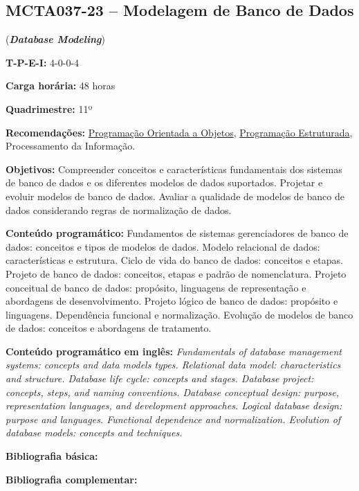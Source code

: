 \documentclass[12pt,a4paper]{article}
\begin{document}
\subsection{MCTA037-23 -- Modelagem de Banco de Dados}
\label{disc:mbd}

(\textbf{\textit{Database Modeling}})

\begin{center}
\begin{minipage}{0.85\textwidth}
    
    \textbf{T-P-E-I:} 4-0-0-4

    \textbf{Carga horária:} 48 horas
    
    \textbf{Quadrimestre:} 11º 
    
    \textbf{Recomendações:} 
    \hyperref[disc:poo]{Programação Orientada a Objetos},
    \hyperref[disc:pe]{Programação Estruturada},
    Processamento da Informação.
    
\end{minipage}
\end{center}

\textbf{Objetivos:}
Compreender conceitos e características fundamentais dos sistemas de banco de
dados e os diferentes modelos de dados suportados. 
Projetar e evoluir modelos de banco de dados. 
Avaliar a qualidade de modelos de banco de dados considerando regras de
normalização de dados.

\textbf{Conteúdo programático:}
Fundamentos de sistemas gerenciadores de banco de dados: conceitos e tipos de modelos de dados.
Modelo relacional de dados: características e estrutura.  
Ciclo de vida do banco de dados: conceitos e etapas. 
Projeto de banco de dados: conceitos, etapas e padrão de nomenclatura. 
Projeto conceitual de banco de dados: propósito, linguagens de representação e abordagens de desenvolvimento. 
Projeto lógico de banco de dados: propósito e linguagens. 
Dependência funcional e normalização. 
Evolução de modelos de banco de dados: conceitos e abordagens de tratamento.

\textbf{Conteúdo programático em inglês:}
\textit{Fundamentals of database management systems: concepts and data models types.
Relational data model: characteristics and structure.
Database life cycle: concepts and stages.
Database project: concepts, steps, and naming conventions.
Database conceptual design: purpose, representation languages, and development approaches.
Logical database design: purpose and languages.
Functional dependence and normalization.
Evolution of database models: concepts and techniques.}

\newrefsection
\textbf{Bibliografia básica:}
\nocite{2015-date, 2013-teory-etal, 2005-elmasri-navathe} 
\printbibliography

\newrefsection
\textbf{Bibliografia complementar:}
\nocite{2006-allen-terry, 2005-date, 2012-silberschatz-etal, 2011-coronel, 2008-halpin-morgan}
\printbibliography
\end{document}
